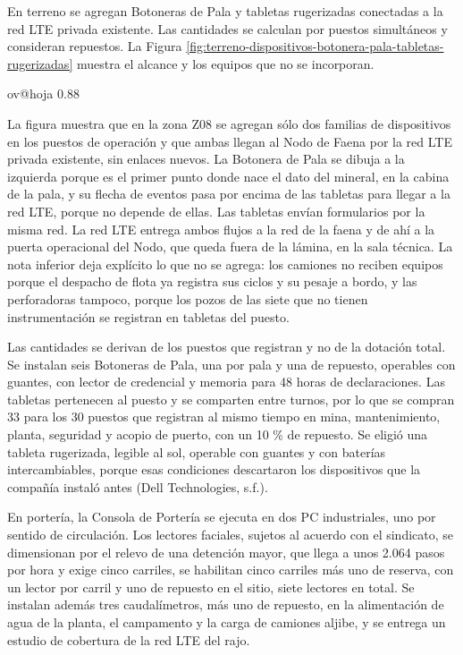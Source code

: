 \documentclass[subdoc]{../../comun/overfore}
\begin{document}
En terreno se agregan Botoneras de Pala y tabletas rugerizadas conectadas a la red LTE privada existente. Las cantidades se calculan por puestos simultáneos y consideran repuestos. La Figura \ref{fig:terreno-dispositivos-botonera-pala-tabletas-rugerizadas} muestra el alcance y los equipos que no se incorporan.

\begin{horizontal}
\csname ov@hoja\endcsname{330.2mm}{215.9mm}
\expandafter\def\csname ov@altofig\endcsname{0.88}
\end{horizontal}
La figura muestra que en la zona Z08 se agregan sólo dos familias de dispositivos en los puestos de operación y que ambas llegan al Nodo de Faena por la red LTE privada existente, sin enlaces nuevos. La Botonera de Pala se dibuja a la izquierda porque es el primer punto donde nace el dato del mineral, en la cabina de la pala, y su flecha de eventos pasa por encima de las tabletas para llegar a la red LTE, porque no depende de ellas. Las tabletas envían formularios por la misma red. La red LTE entrega ambos flujos a la red de la faena y de ahí a la puerta operacional del Nodo, que queda fuera de la lámina, en la sala técnica. La nota inferior deja explícito lo que no se agrega: los camiones no reciben equipos porque el despacho de flota ya registra sus ciclos y su pesaje a bordo, y las perforadoras tampoco, porque los pozos de las siete que no tienen instrumentación se registran en tabletas del puesto.

Las cantidades se derivan de los puestos que registran y no de la dotación total. Se instalan seis Botoneras de Pala, una por pala y una de repuesto, operables con guantes, con lector de credencial y memoria para 48 horas de declaraciones. Las tabletas pertenecen al puesto y se comparten entre turnos, por lo que se compran 33 para los 30 puestos que registran al mismo tiempo en mina, mantenimiento, planta, seguridad y acopio de puerto, con un 10 \% de repuesto. Se eligió una tableta rugerizada, legible al sol, operable con guantes y con baterías intercambiables, porque esas condiciones descartaron los dispositivos que la compañía instaló antes (Dell Technologies, s.f.).

En portería, la Consola de Portería se ejecuta en dos PC industriales, uno por sentido de circulación. Los lectores faciales, sujetos al acuerdo con el sindicato, se dimensionan por el relevo de una detención mayor, que llega a unos 2.064 pasos por hora y exige cinco carriles, se habilitan cinco carriles más uno de reserva, con un lector por carril y uno de repuesto en el sitio, siete lectores en total. Se instalan además tres caudalímetros, más uno de repuesto, en la alimentación de agua de la planta, el campamento y la carga de camiones aljibe, y se entrega un estudio de cobertura de la red LTE del rajo.
\end{document}
